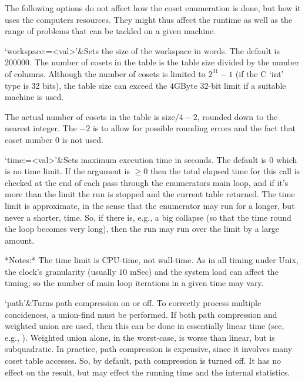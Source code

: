 \enditems


The following options do not affect how the coset enumeration is done, but
how it uses the computers resources. They might thus affect the runtime as
well as the range of problems that can be tackled on a given machine.

\beginitems
`workspace:=<val>'&Sets the size of the workspace in words.
The default is 200000. 
The number of cosets in the table is the table size divided by the number of
columns.  Although the number of cosets is limited to $2^{31}-1$ (if the C
`int' type is 32 bits), the table size can exceed the $4$GByte 32-bit limit
if a suitable machine is used.

The actual number of cosets in the table is size$/4 -2$, rounded down to the
nearest integer.  The $-2$ is to allow for possible rounding errors and the
fact that coset number 0 is not used.

`time:=<val>'&Sets maximum execution time in seconds.
The default is 0 which is no time limit.
If the argument is $\ge0$ then the total elapsed time for this call is
checked at the end of each pass through the enumerator{\pif}s main loop, and
if it's more than the limit the run is stopped and the current table
returned.
%
The time limit is approximate, in the sense that the enumerator may run for
a longer, but never a shorter, time.  So, if there is, e.g., a big collapse
(so that the time round the loop becomes very long), then the run may run
over the limit by a large amount.

*Notes:*
The time limit is CPU-time, not wall-time.
As in all timing under Unix, the clock's granularity (usually $10$ mSec)
  and the system load can affect the timing; so the number of main loop
  iterations in a given time may vary.

`path'&Turns path compression on or off.
To correctly process multiple concidences, a union-find must be performed.
If both path compression and weighted union are used, then this can be
  done in essentially linear time (see, e.g., \cite{CLR}).
Weighted union alone, in the worst-case, is worse than linear, but is
  subquadratic.
In practice, path compression is expensive, since it involves many coset
  table accesses.
So, by default, path compression is turned off.
It has no effect on the result, but may effect the running time and the
  internal statistics.

